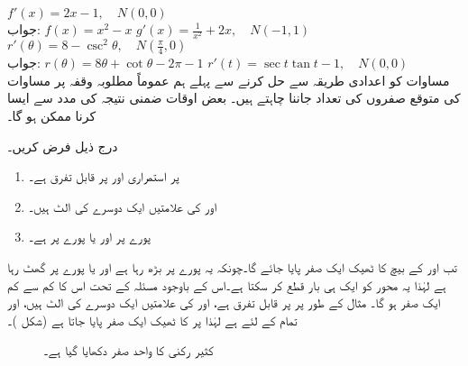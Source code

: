 $f'(x)=2x-1,\quad N(0,0)$\\
جواب:\quad
$f(x)=x^2-x$
$g'(x)=\tfrac{1}{x^2}+2x,\quad N(-1,1)$
$r'(\theta)=8-\csc^2\theta,\quad N(\tfrac{\pi}{4},0)$\\
جواب:\quad
$r(\theta)=8\theta+\cot \theta-2\pi-1$
$r'(t)=\sec t\tan t-1,\quad N(0,0)$
\\
مساوات  کو اعدادی طریقہ سے حل کرنے سے پہلے ہم عموماً  مطلوبہ وقفہ پر  مساوات کی متوقع صفروں کی تعداد جاننا چاہتے ہیں۔ بعض اوقات ضمنی نتیجہ  کی مدد سے ایسا کرنا ممکن ہو گا۔

درج ذیل فرض کریں۔
\begin{enumerate}[1.]
\item
{} پر  استمراری اور  پر قابل تفرق ہے۔
\item
{} اور  کی علامتیں ایک دوسرے کی الٹ ہیں۔
\item
پورے  پر  اور یا پورے  پر  ہے۔
\end{enumerate}
تب  اور  کے بیچ  کا ٹھیک ایک صفر پایا جائے گا۔چونکہ یہ پورے  پر بڑھ رہا ہے اور یا  پورے  پر گھٹ رہا ہے لہٰذا یہ  محور کو ایک ہی بار قطع کر سکتا ہے۔اس کے باوجود مسئلہ  کے تحت اس کا کم سے کم ایک صفر ہو گا۔ مثال کے طور پر  پر  قابل تفرق ہے،  اور  کی علامتیں ایک دوسرے کی الٹ ہیں، اور تمام  کے لئے  ہے  لہٰذا  پر  کا ٹھیک ایک صفر پایا جاتا ہے (شکل )۔
\begin{figure}
\centering
{}
\caption{کثیر رکنی  کا واحد صفر دکھایا گیا ہے۔}
\label{شکل_استعمال_یک_صفر_مثال}
\end{figure}

